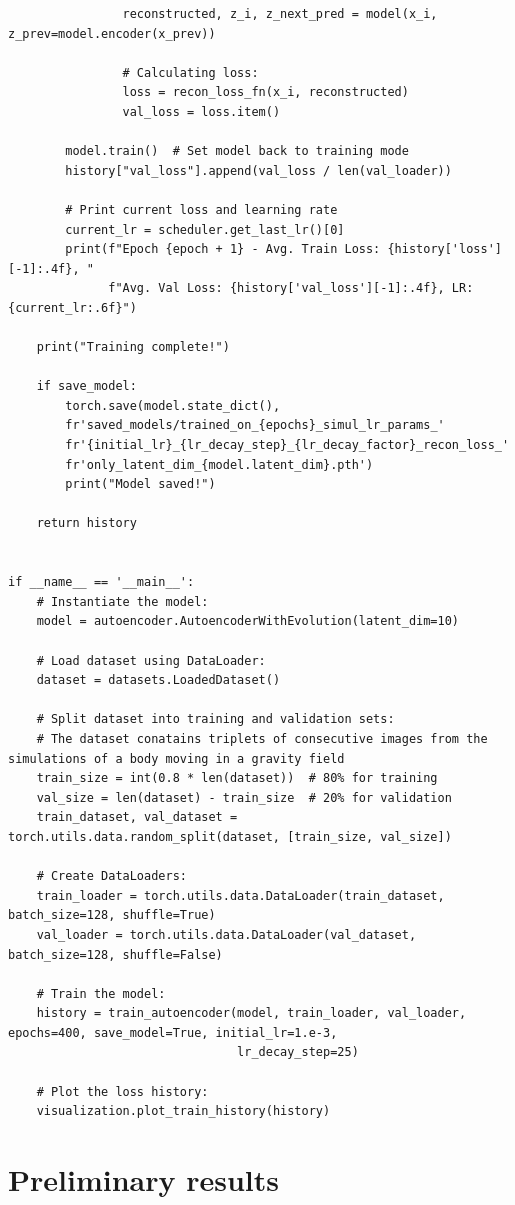 \documentclass[12pt,letterpaper]{article}
\begin{document}
\begin{lstlisting}
                reconstructed, z_i, z_next_pred = model(x_i, z_prev=model.encoder(x_prev))

                # Calculating loss:
                loss = recon_loss_fn(x_i, reconstructed)
                val_loss = loss.item()

        model.train()  # Set model back to training mode
        history["val_loss"].append(val_loss / len(val_loader))

        # Print current loss and learning rate
        current_lr = scheduler.get_last_lr()[0]
        print(f"Epoch {epoch + 1} - Avg. Train Loss: {history['loss'][-1]:.4f}, "
              f"Avg. Val Loss: {history['val_loss'][-1]:.4f}, LR: {current_lr:.6f}")

    print("Training complete!")

    if save_model:
        torch.save(model.state_dict(),
        fr'saved_models/trained_on_{epochs}_simul_lr_params_'
        fr'{initial_lr}_{lr_decay_step}_{lr_decay_factor}_recon_loss_'
        fr'only_latent_dim_{model.latent_dim}.pth')
        print("Model saved!")

    return history


if __name__ == '__main__':
    # Instantiate the model:
    model = autoencoder.AutoencoderWithEvolution(latent_dim=10)

    # Load dataset using DataLoader:
    dataset = datasets.LoadedDataset()

    # Split dataset into training and validation sets:
    # The dataset conatains triplets of consecutive images from the simulations of a body moving in a gravity field
    train_size = int(0.8 * len(dataset))  # 80% for training
    val_size = len(dataset) - train_size  # 20% for validation
    train_dataset, val_dataset = torch.utils.data.random_split(dataset, [train_size, val_size])

    # Create DataLoaders:
    train_loader = torch.utils.data.DataLoader(train_dataset, batch_size=128, shuffle=True)
    val_loader = torch.utils.data.DataLoader(val_dataset, batch_size=128, shuffle=False)

    # Train the model:
    history = train_autoencoder(model, train_loader, val_loader, epochs=400, save_model=True, initial_lr=1.e-3,
                                lr_decay_step=25)

    # Plot the loss history:
    visualization.plot_train_history(history)
\end{lstlisting}

\section{Preliminary results}
\end{document}
